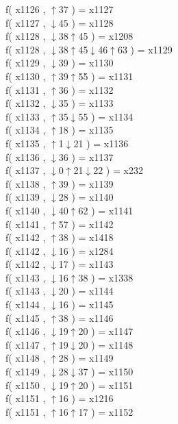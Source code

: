 f( x1126 , $\uparrow$37 ) = x1127 \\
f( x1127 , $\downarrow$45 ) = x1128 \\
f( x1128 , $\downarrow$38$\uparrow$45 ) = x1208 \\
f( x1128 , $\downarrow$38$\uparrow$45$\downarrow$46$\uparrow$63 ) = x1129 \\
f( x1129 , $\downarrow$39 ) = x1130 \\
f( x1130 , $\uparrow$39$\uparrow$55 ) = x1131 \\
f( x1131 , $\uparrow$36 ) = x1132 \\
f( x1132 , $\downarrow$35 ) = x1133 \\
f( x1133 , $\uparrow$35$\downarrow$55 ) = x1134 \\
f( x1134 , $\uparrow$18 ) = x1135 \\
f( x1135 , $\uparrow$1$\downarrow$21 ) = x1136 \\
f( x1136 , $\downarrow$36 ) = x1137 \\
f( x1137 , $\downarrow$0$\uparrow$21$\downarrow$22 ) = x232 \\
f( x1138 , $\uparrow$39 ) = x1139 \\
f( x1139 , $\downarrow$28 ) = x1140 \\
f( x1140 , $\downarrow$40$\uparrow$62 ) = x1141 \\
f( x1141 , $\uparrow$57 ) = x1142 \\
f( x1142 , $\uparrow$38 ) = x1418 \\
f( x1142 , $\downarrow$16 ) = x1284 \\
f( x1142 , $\downarrow$17 ) = x1143 \\
f( x1143 , $\downarrow$16$\uparrow$38 ) = x1338 \\
f( x1143 , $\downarrow$20 ) = x1144 \\
f( x1144 , $\downarrow$16 ) = x1145 \\
f( x1145 , $\uparrow$38 ) = x1146 \\
f( x1146 , $\downarrow$19$\uparrow$20 ) = x1147 \\
f( x1147 , $\uparrow$19$\downarrow$20 ) = x1148 \\
f( x1148 , $\uparrow$28 ) = x1149 \\
f( x1149 , $\downarrow$28$\downarrow$37 ) = x1150 \\
f( x1150 , $\downarrow$19$\uparrow$20 ) = x1151 \\
f( x1151 , $\uparrow$16 ) = x1216 \\
f( x1151 , $\uparrow$16$\uparrow$17 ) = x1152 \\
